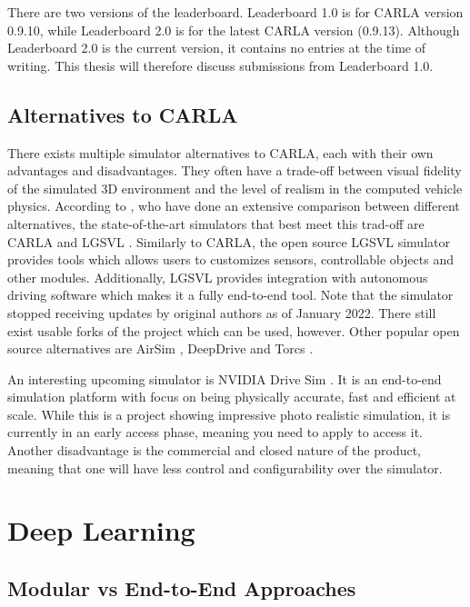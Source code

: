 There are two versions of the leaderboard. Leaderboard 1.0 is for CARLA version 0.9.10, while Leaderboard 2.0 is for the latest CARLA version (0.9.13). Although Leaderboard 2.0 is the current version, it contains no entries at the time of writing. This thesis will therefore discuss submissions from Leaderboard 1.0.


\subsection{Alternatives to CARLA}
There exists multiple simulator alternatives to CARLA, each with their own advantages and disadvantages. They often have a trade-off between visual fidelity of the simulated 3D environment and the level of realism in the computed vehicle physics. According to \textcite{carla-an-inside-out}, who have done an extensive comparison between different alternatives, the state-of-the-art simulators that best meet this trad-off are CARLA and LGSVL \cite{LGSVL-simulator}. Similarly to CARLA, the open source LGSVL simulator provides tools which allows users to customizes sensors, controllable objects and other modules. Additionally, LGSVL provides integration with autonomous driving software which makes it a fully end-to-end tool. Note that the simulator stopped receiving updates by original authors as of January 2022. There still exist usable forks of the project which can be used, however. Other popular open source alternatives are AirSim \cite{airsim}, DeepDrive \cite{deepdrive} and Torcs \cite{torcs}.

An interesting upcoming simulator is NVIDIA Drive Sim \cite{nvidia-drive-sim}. It is an end-to-end simulation platform with focus on being physically accurate, fast and efficient at scale. While this is a project showing impressive photo realistic simulation, it is currently in an early access phase, meaning you need to apply to access it. Another disadvantage is the commercial and closed nature of the product, meaning that one will have less control and configurability over the simulator.


\section{Deep Learning}

\subsection{Modular vs End-to-End Approaches}

